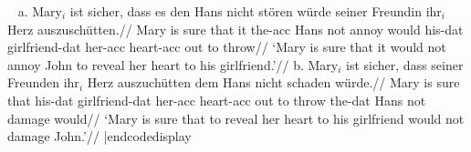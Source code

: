 \codedisplay~
\ex[glwidth=2.6in]
a.\quad
\begingl
\gla Mary$_i$ ist sicher, dass es den Hans nicht st\"oren w\"urde
seiner Freundin ihr$_i$ Herz auszusch\"utten.//
\glb Mary is sure that it the-{\sc acc} Hans not annoy would
his-{\sc dat} girlfriend-{\sc dat} her-{\sc acc} heart-{\sc acc} {out to
throw}//
\glft  `Mary is sure that it would not annoy John to reveal her
heart to his girlfriend.'//
\endgl
\hfil
b.\quad
\begingl
\gla Mary$_i$ ist sicher, dass seiner Freunden ihr$_i$ Herz
auszuch\"utten dem Hans nicht schaden w\"urde.//
\glb Mary is sure that his-{\sc dat} girlfriend-{\sc dat} her-{\sc acc}
heart-{\sc acc} {out to throw} the-{\sc dat} Hans not damage would//
\glft `Mary is sure that to reveal her heart to his girlfriend
would not damage John.'//
\endgl
\xe
|endcodedisplay



%
%
%
%
%
%

